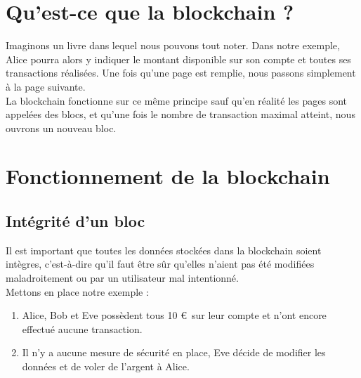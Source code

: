 \documentclass[12pt, a4paper, oneside]{book}
\begin{document}
    \section{Qu'est-ce que la blockchain ?}
    Imaginons un livre dans lequel nous pouvons tout noter. Dans notre exemple, Alice pourra alors y indiquer le montant disponible sur son compte et toutes ses transactions réalisées. Une fois qu’une page est remplie, nous passons simplement à la page suivante.
    \\
    La blockchain fonctionne sur ce même principe sauf qu’en réalité les pages sont appelées des blocs, et qu’une fois le nombre de transaction maximal atteint, nous ouvrons un nouveau bloc.

    \section{Fonctionnement de la blockchain}
    \subsection{Intégrité d'un bloc}
    Il est important que toutes les données stockées dans la blockchain soient intègres, c’est-à-dire qu’il faut être sûr qu’elles n’aient pas été modifiées maladroitement ou par un utilisateur mal intentionné.
    \\
    Mettons en place notre exemple :
    \begin{enumerate}
        \item Alice, Bob et Eve possèdent tous 10 \euro~sur leur compte et n’ont encore effectué aucune transaction.
        \item Il n'y a aucune mesure de sécurité en place, Eve décide de modifier les données et de voler de l’argent à Alice.
    \end{enumerate}
\end{document}
